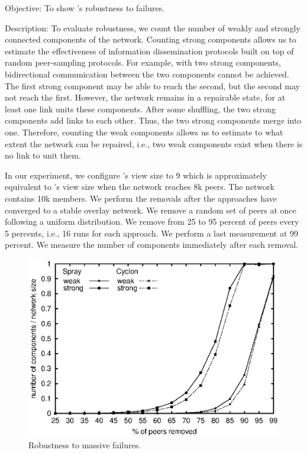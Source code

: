 \begin{asparadesc}
\item[Objective:] To show \SPRAY's robustness to failures.
\item[Description:] To evaluate robustness, we count the number of weakly and
  strongly connected components of the network. Counting strong components
  allows us to estimate the effectiveness of information dissemination protocols
  built on top of random peer-sampling protocols. For example, with two strong
  components, bidirectional communication between the two components cannot be
  achieved. The first strong component may be able to reach the second, but the
  second may not reach the first. However, the network remains in a repairable
  state, for at least one link units these components. After some shuffling, the
  two strong components add links to each other. Thus, the two strong components
  merge into one. Therefore, counting the weak components allows us to estimate
  to what extent the network can be repaired, i.e., two weak components exist
  when there is no link to unit them.

  In our experiment, we configure \CYCLON's view size to 9 which is
  approximately equivalent to \SPRAY's view size when the network reaches 8k
  peers. The network contains 10k members. We perform the removals after the
  approaches have converged to a stable overlay network. We remove a random set
  of peers at once following a uniform distribution. We remove from 25 to 95
  percent of peers every 5 percents, i.e., 16 runs for each approach. We perform
  a last measurement at 99 percent. We measure the number of components
  immediately after each removal.

\begin{figure}
  \centering
  \includegraphics[width=\SCALE\columnwidth]{img/resilience.eps}
  \caption{\label{fig:resilience}Robustness to massive failures.}
\end{figure}


\end{asparadesc}
